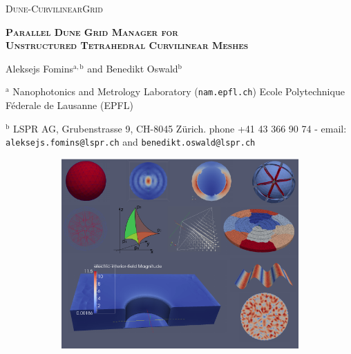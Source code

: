 \documentclass[a4paper,11pt]{article}
\begin{document}
\lstset{language=C++, breaklines=true}



\begin{titlepage}




\begin{center}
    
\noindent \textsc{{\Large Dune-CurvilinearGrid}}

\vspace{5mm}

\noindent \textbf{\textsc{{\Large Parallel Dune Grid Manager for\\Unstructured Tetrahedral Curvilinear Meshes}}}
  
\vspace{2mm}
    
{\large
    
\noindent Aleksejs Fomins$^{\mathrm{a,b}}$ and Benedikt Oswald$^{\mathrm{b}}$

  }

\vspace{1mm}

\noindent $^{\mathrm{a}}$ Nanophotonics and Metrology Laboratory (\texttt{nam.epfl.ch})
\noindent Ecole Polytechnique F\'ederale de Lausanne (EPFL)
  
\vspace{1mm}

\noindent $^{\mathrm{b}}$ LSPR AG, Grubenstrasse 9, CH-8045 Z\"urich.
\noindent phone +41 43 366 90 74 - email: \texttt{aleksejs.fomins@lspr.ch} and \texttt{benedikt.oswald@lspr.ch}

\vspace{2mm}

\end{center}


\begin{figure}[H]
    \centering
	\begin{subfigure}[b]{\textwidth} \hspace{4mm} \includegraphics[scale=1.5]{images/frontpage} \end{subfigure}
    

\end{figure}
\end{titlepage}
\end{document}
